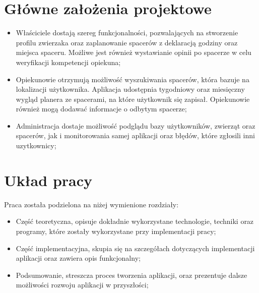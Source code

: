 \section{Główne założenia projektowe}
\begin{itemize}
    \item Właściciele dostają szereg funkcjonalności, pozwalających na stworzenie profilu zwierzaka oraz zaplanowanie spacerów z deklaracją godziny oraz miejsca spaceru. Możliwe jest również wystawianie opinii po spacerze w celu weryfikacji kompetencji opiekuna;
    \item Opiekunowie otrzymują możliwość wyszukiwania spacerów, która bazuje na lokalizacji użytkownika. Aplikacja udostępnia tygodniowy oraz miesięczny wygląd planera ze spacerami, na które użytkownik się zapisał. Opiekunowie również mogą dodawać informacje o odbytym spacerze;
    \item Administracja dostaje możliwość podglądu bazy użytkowników, zwierząt oraz spacerów, jak i monitorowania samej aplikacji oraz błędów, które zgłosili inni uzytkownicy;
\end{itemize}
\section{Układ pracy}
Praca została podzielona na niżej wymienione rozdziały:
\begin{itemize}
    \item Część teoretyczna, opisuje dokładnie wykorzystane technologie, techniki oraz programy, które zostały wykorzystane przy implementacji pracy;

    \item Część implementacyjna, skupia się na szczegółach dotyczących implementacji aplikacji oraz zawiera opis funkcjonalny;

    \item Podsumowanie, streszcza proces tworzenia aplikacji, oraz prezentuje dalsze możliwości rozwoju aplikacji w przyszłości;
\end{itemize}

